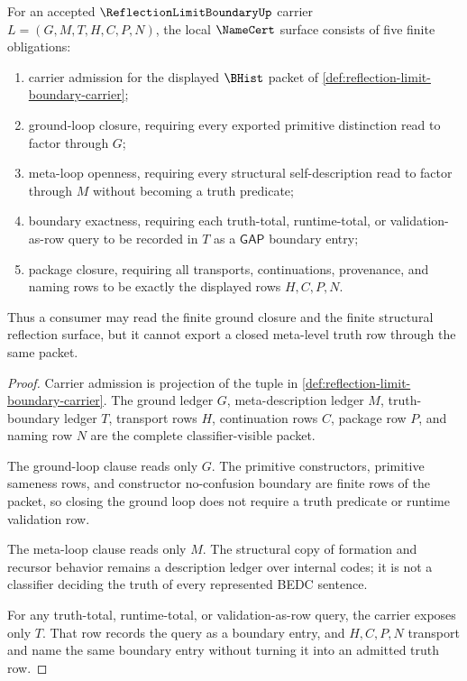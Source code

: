 \begin{theorem}
\label{thm:reflection-limit-namecert-obligations}
For an accepted $\ReflectionLimitBoundaryUp$ carrier $L=(G,M,T,H,C,P,N)$, the local $\NameCert$ surface consists of five finite obligations:
\begin{enumerate}
\item carrier admission for the displayed $\BHist$ packet of \autoref{def:reflection-limit-boundary-carrier};
\item ground-loop closure, requiring every exported primitive distinction read to factor through $G$;
\item meta-loop openness, requiring every structural self-description read to factor through $M$ without becoming a truth predicate;
\item boundary exactness, requiring each truth-total, runtime-total, or validation-as-row query to be recorded in $T$ as a $\mathsf{GAP}$ boundary entry;
\item package closure, requiring all transports, continuations, provenance, and naming rows to be exactly the displayed rows $H,C,P,N$.
\end{enumerate}
Thus a consumer may read the finite ground closure and the finite structural reflection surface, but it cannot export a closed meta-level truth row through the same packet.
\end{theorem}
\begin{proof}
Carrier admission is projection of the tuple in \autoref{def:reflection-limit-boundary-carrier}. The ground ledger $G$, meta-description ledger $M$, truth-boundary ledger $T$, transport rows $H$, continuation rows $C$, package row $P$, and naming row $N$ are the complete classifier-visible packet.

The ground-loop clause reads only $G$. The primitive constructors, primitive sameness rows, and constructor no-confusion boundary are finite rows of the packet, so closing the ground loop does not require a truth predicate or runtime validation row.

The meta-loop clause reads only $M$. The structural copy of formation and recursor behavior remains a description ledger over internal codes; it is not a classifier deciding the truth of every represented BEDC sentence.

For any truth-total, runtime-total, or validation-as-row query, the carrier exposes only $T$. That row records the query as a boundary entry, and $H,C,P,N$ transport and name the same boundary entry without turning it into an admitted truth row.
\end{proof}

